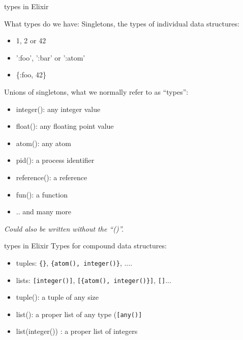 \begin{frame}{types in Elixir}

What types do we have:
\pause\vspace{10pt}
Singletons, the types of individual data structures:
\begin{itemize}
\item  1, 2 or 42
\item ':foo', ':bar' or ':atom'
\item  \{:foo, 42\}
\end{itemize}
\pause\vspace{10pt}
Unions of singletons, what we normally refer to as ``types'':
\begin{itemize}
\item integer(): any integer value 
\item float(): any floating point value 
\item atom(): any atom 
\item pid(): a process identifier
\item reference(): a reference
\item fun(): a function 
\item .. and many more
\end{itemize}

{\em Could also be written without the ``()''. }
\end{frame}

\begin{frame}{types in Elixir}
Types for compound data structures:
\pause\vspace{10pt}
\begin{itemize}
\item  tuples: {\tt \{\}}, {\tt \{atom(), integer()\}}, ....
\item  lists: {\tt [integer()]}, {\tt [\{atom(), integer()\}]}, {\tt []}... \pause
\end{itemize}

\begin{itemize}
\item  tuple(): a tuple of any size \pause
\item  list(): a proper list of any type ({\tt [any()]} \pause
\item  list(integer()) : a proper list of integers \pause
\end{itemize} \pause

\end{frame}


